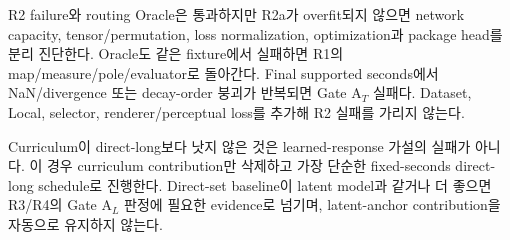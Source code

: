 \documentclass[10pt]{article}
\begin{document}
\begin{stopbox}{R2 failure와 routing}
Oracle은 통과하지만 R2a가 overfit되지 않으면 network capacity, tensor/permutation, loss normalization,
optimization과 package head를 분리 진단한다. Oracle도 같은 fixture에서 실패하면 R1의 map/measure/pole/evaluator로
돌아간다. Final supported seconds에서 NaN/divergence 또는 decay-order 붕괴가 반복되면 Gate A\(_T\) 실패다.
Dataset, Local, selector, renderer/perceptual loss를 추가해 R2 실패를 가리지 않는다.
\end{stopbox}

Curriculum이 direct-long보다 낫지 않은 것은 learned-response 가설의 실패가 아니다.
이 경우 curriculum contribution만 삭제하고 가장 단순한 fixed-seconds direct-long schedule로 진행한다.
Direct-set baseline이 latent model과 같거나 더 좋으면 R3/R4의 Gate A\(_L\) 판정에 필요한 evidence로 넘기며,
latent-anchor contribution을 자동으로 유지하지 않는다.
\end{document}
